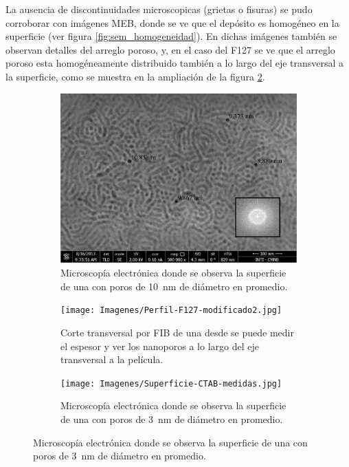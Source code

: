 		La ausencia de discontinuidades microscopicas (grietas o fisuras) se pudo corroborar con imágenes MEB, donde se ve que el depósito es homogéneo en la superficie (ver figura \ref{fig:sem_homogeneidad}). En dichas imágenes también se observan detalles del arreglo poroso, y, en el caso del F127 se ve que el arreglo poroso esta homogéneamente distribuido también a lo largo del eje transversal a la superficie, como se muestra en la ampliación de la figura \ref{fig:sem_homogeneidad2}.

			\begin{figure}[th]
		 	   	    \begin{subfigure}[t]{0.49\textwidth}
			        	\includegraphics[width=\textwidth]{Imagenes/Superficie-F127-medidas.jpg}
			       		\caption{Microscopía electrónica donde se observa la superficie de una \pdmF\space con poros de \SI{10}{nm} de diámetro en promedio.}
			       		\label{fig:sem_homogeneidad1}
			       		\end{subfigure}
					\begin{subfigure}[t]{0.49\textwidth}
			 	   	    \texttt{[image: Imagenes/Perfil-F127-modificado2.jpg]}
			       		\caption{Corte transversal por FIB de una \pdmF\space desde se puede medir el espesor y ver los nanoporos a lo largo del eje transversal a la película.}
			       		\label{fig:sem_homogeneidad2}
			       		\end{subfigure}
			       	\begin{subfigure}[t]{0.49\textwidth}
			        	\texttt{[image: Imagenes/Superficie-CTAB-medidas.jpg]}
			       		\caption{Microscopía electrónica donde se observa la superficie de una \pdmC\space con poros de \SI{3}{nm} de diámetro en promedio.}

\end{subfigure}
\end{figure}
